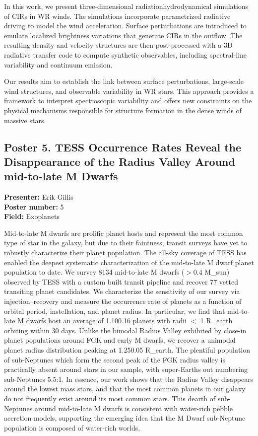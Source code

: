 In this work, we present three-dimensional radiationhydrodynamical simulations of CIRs in WR winds. The simulations incorporate parametrized radiative driving to model the wind acceleration. Surface perturbations are introduced to emulate localized brightness variations that generate CIRs in the outflow. The resulting density and velocity structures are then post-processed with a 3D radiative transfer code to compute synthetic observables, including spectral-line variability and continuum emission.

Our results aim to establish the link between surface perturbations, large-scale wind structures, and observable variability in WR stars. This approach provides a framework to interpret spectroscopic variability and offers new constraints on the physical mechanisms responsible for structure formation in the dense winds of massive stars.

\hypertarget{poster-abstract-talk-7}{}\label{poster-abstract-page-talk-7}
\subsection*{Poster 5. TESS Occurrence Rates Reveal the Disappearance of the Radius Valley Around mid-to-late M Dwarfs}
\textbf{Presenter:} Erik Gillis\\
\textbf{Poster number:} 5\\
\textbf{Field:} Exoplanets

Mid-to-late M dwarfs are prolific planet hosts and represent the most common type of star in the galaxy, but due to their faintness, transit surveys have yet to robustly characterize their planet population. The all-sky coverage of TESS has enabled the deepest systematic characterization of the mid-to-late M dwarf planet population to date. We survey 8134 mid-to-late M dwarfs ($>$0.4 M\_sun) observed by TESS with a custom built transit pipeline and recover 77 vetted transiting planet candidates. We characterize the sensitivity of our survey via injection--recovery and measure the occurrence rate of planets as a function of orbital period, instellation, and planet radius. In particular, we find that mid-to-late M dwarfs host an average of 1.100.16 planets with radii $<$ 1 R\_earth orbiting within 30 days. Unlike the bimodal Radius Valley exhibited by close-in planet populations around FGK and early M dwarfs, we recover a unimodal planet radius distribution peaking at 1.250.05 R\_earth. The plentiful population of sub-Neptunes which form the second peak of the FGK radius valley is practically absent around stars in our sample, with super-Earths out numbering sub-Neptunes 5.5:1. In essence, our work shows that the Radius Valley disappears around the lowest mass stars, and that the most common planets in our galaxy do not frequently exist around its most common stars. This dearth of sub-Neptunes around mid-to-late M dwarfs is consistent with water-rich pebble accretion models, supporting the emerging idea that the M Dwarf sub-Neptune population is composed of water-rich worlds.

